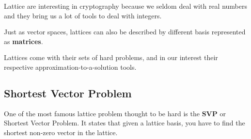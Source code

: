 \documentclass[a4paper,11pt]{article}
\begin{document}
Lattice are interesting in cryptography because we seldom deal with real numbers and they bring us a lot of tools to deal with integers.

Just as vector spaces, lattices can also be described by different basis represented as \textbf{matrices}. 

Lattices come with their sets of hard problems, and in our interest their respective approximation-to-a-solution tools.

\subsection{Shortest Vector Problem}

One of the most famous lattice problem thought to be hard is the \textbf{SVP} or Shortest Vector Problem. It states that given a lattice basis, you have to find the shortest non-zero vector in the lattice.
\end{document}
